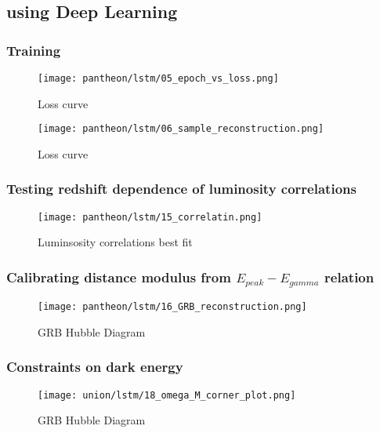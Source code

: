 \subsection{using Deep Learning}
\subsubsection{Training}
\begin{figure}[h]
	\centering
	\texttt{[image: pantheon/lstm/05\_epoch\_vs\_loss.png]}
	\caption{Loss curve}
	\label{fig:loss_curve_union}
\end{figure}
\begin{figure}[h]
	\centering
	\texttt{[image: pantheon/lstm/06\_sample\_reconstruction.png]}
	\caption{Loss curve}
	\label{fig:reconstruction_lstm_union}
\end{figure}
\subsubsection{Testing redshift dependence of luminosity correlations}
\begin{figure}[h]
	\centering
	\texttt{[image: pantheon/lstm/15\_correlatin.png]}
	\caption{Luminsosity correlations best fit}
	\label{fig:correlation_lstm_union}
\end{figure}
\subsubsection{Calibrating distance modulus from $E_{peak}-E_{gamma}$ relation}
\begin{figure}[h]
	\centering
	\texttt{[image: pantheon/lstm/16\_GRB\_reconstruction.png]}
	\caption{GRB Hubble Diagram}
	\label{fig:HD_GRB_LSTM_union}
\end{figure}
\subsubsection{Constraints on dark energy}
\begin{figure}[h]
	\centering
	\texttt{[image: union/lstm/18\_omega\_M\_corner\_plot.png]}
	\caption{GRB Hubble Diagram}
	\label{fig:OmegaM_lstm_union}
\end{figure}

